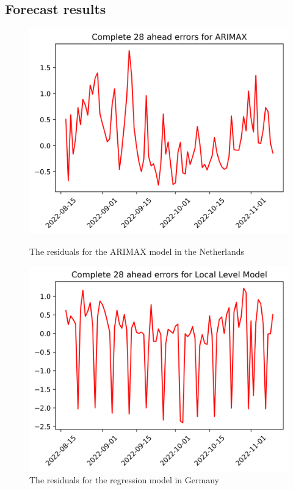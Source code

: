 \subsection{Forecast results}
\begin{figure}
\begin{minipage}{.5\textwidth}
  \centering
  \includegraphics[width=\linewidth]{pics/28_ah/28_ahead_errors_ARIMAX.png}
  \caption{The residuals for the ARIMAX model in the Netherlands}
  \label{fig:ARIMAX 28 ahead}
\end{minipage}
\begin{minipage}{.5\textwidth}
  \centering
  \includegraphics[width=\linewidth]{pics/28_ah/DE_28_ahead_errors_Local Level Model.png}
  \caption{The residuals for the regression model in Germany}
  \label{fig:DE residuals LLM}
\end{minipage}
\end{figure}

